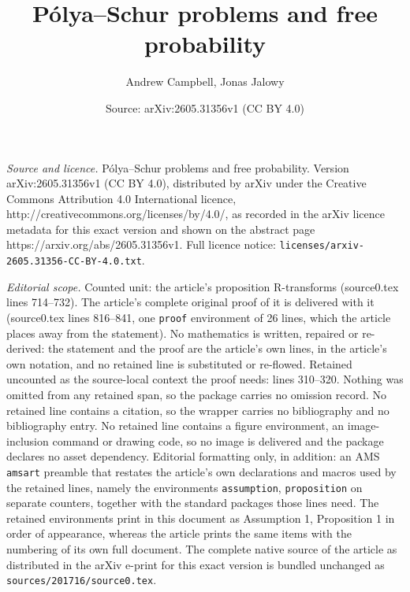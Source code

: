 \documentclass[10pt,a4paper]{amsart}
\title{P\'olya--Schur problems and free probability}
\author{Andrew Campbell, Jonas Jalowy}
\date{Source: arXiv:2605.31356v1 (CC BY 4.0)}
\begin{document}
\maketitle

\noindent\emph{Source and licence.} P\'olya--Schur problems and free probability. Version arXiv:2605.31356v1 (CC BY 4.0), distributed by arXiv under the Creative Commons Attribution 4.0 International licence, http://creativecommons.org/licenses/by/4.0/, as recorded in the arXiv licence metadata for this exact version and shown on the abstract page https://arxiv.org/abs/2605.31356v1. Full licence notice: \texttt{licenses/arxiv-2605.31356-CC-BY-4.0.txt}.\par\smallskip

\noindent\textit{Editorial scope.} Counted unit: the article's proposition R-transforms (source0.tex lines 714--732). The article's complete original proof of it is delivered with it (source0.tex lines 816--841, one \texttt{proof} environment of 26 lines, which the article places away from the statement). No mathematics is written, repaired or re-derived: the statement and the proof are the article's own lines, in the article's own notation, and no retained line is substituted or re-flowed.  Retained uncounted as the source-local context the proof needs: lines 310--320.  Nothing was omitted from any retained span, so the package carries no omission record.  No retained line contains a citation, so the wrapper carries no bibliography and no bibliography entry.  No retained line contains a figure environment, an image-inclusion command or drawing code, so no image is delivered and the package declares no asset dependency.  Editorial formatting only, in addition: an AMS \texttt{amsart} preamble that restates the article's own declarations and macros used by the retained lines, namely the environments \texttt{assumption}, \texttt{proposition} on separate counters, together with the standard packages those lines need.  The retained environments print in this document as Assumption 1, Proposition 1 in order of appearance, whereas the article prints the same items with the numbering of its own full document.  The complete native source of the article as distributed in the arXiv e-print for this exact version is bundled unchanged as \texttt{sources/201716/source0.tex}.
\end{document}
